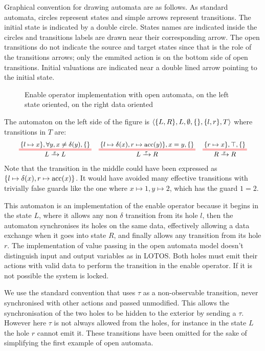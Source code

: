 \documentclass{article}
\begin{document}
\begin{exi}
Graphical convention for drawing automata are as follows.
As standard automata, circles represent states and simple arrows represent transitions.
The initial state is indicated by a double circle.
States names are indicated inside the circles and transitions labels are drawn near their corresponding arrow.
The open transitions do not indicate the source and target states since that is the role of the transitions arrows; only the emmited action is on the bottom side of open transitions.
Initial valuations are indicated near a double lined arrow pointing to the initial state.

\begin{figure}
\centering

\vrule

\caption{Enable operator implementation with open automata, on the left state oriented, on the right data oriented}
\label{fig:enable}
\end{figure}
The automaton on the left side of the figure is \(\left<{\left\{L, R\right\}},L,\emptyset,{\left\{\right\}},{\left\{l, r\right\}},T\right>\) where transitions in \(T\) are:
\begin{align*}
	\OT{L}{L}{x}{\mbrc{l \mapsto x}}{\forall y, x \neq \delta\mpar{y}}{\mbrc{}} &&
	\OT{L}{R}{\tau}{\mbrc{l \mapsto \delta\mpar{x}, r \mapsto \act{acc}\mpar{y}}}{x = y}{\mbrc{}} &&
	\OT{R}{R}{x}{\mbrc{r \mapsto x}}{\top}{\mbrc{}}
\end{align*}
Note that the transition in the middle could have been expressed as \({\left\{l \mapsto \delta{\left(x\right)}, r \mapsto \mathrm{acc}{\left(x\right)}\right\}}\).
It would have avoided many effective transitions with trivially false guards like the one where \(x \mapsto 1, y \mapsto 2\), which has the guard \(1 = 2\).

This automaton is an implementation of the enable operator because it begins in the state \(L\), where it allows any non \(\delta\) transition from its hole \(l\), then the automaton synchronises its holes on the same data, effectively allowing a data exchange when it goes into state \(R\), and finally allows any transition from its hole \(r\).
The implementation of value passing in the open automata model doesn't distinguish input and output variables as in LOTOS.
Both holes must emit their actions with valid data to perform the transition in the enable operator.
If it is not possible the system is locked.

We use the standard convention that uses \(\tau\) as a non-observable transition, never synchronised with other actions and passed unmodified.
This allows the synchronisation of the two holes to be hidden to the exterior by sending a \(\tau\).
However here \(\tau\) is not always allowed from the holes, for instance in the state \(L\) the hole \(r\) cannot emit it.
These transitions have been omitted for the sake of simplifying the first example of open automata.
\end{exi}
\end{document}
